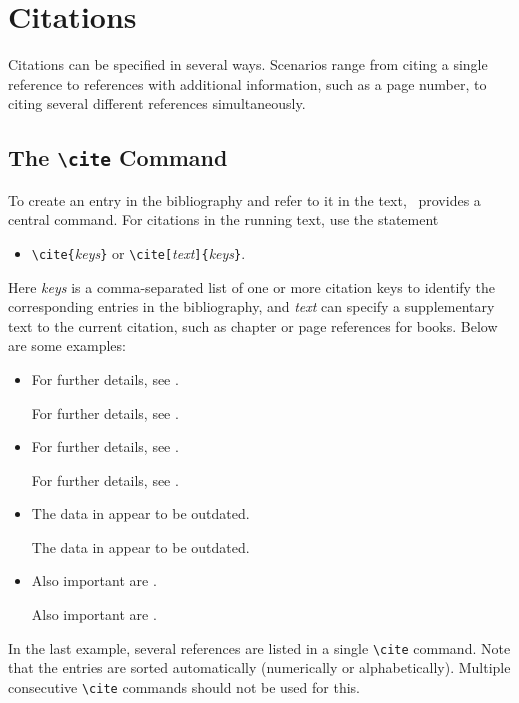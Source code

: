 \section{Citations}

Citations can be specified in several ways. Scenarios range from citing a single
reference to references with additional information, such as a page number, to
citing several different references simultaneously.

\subsection{The \texttt{\textbackslash cite} Command}

To create an entry in the bibliography and refer to it in the text, \latex\
provides a central command. For citations in the running text, use the
statement
%
\begin{itemize}
\item[] \verb!\cite{!\textit{keys}\verb!}! \quad or \quad
				\verb!\cite[!\textit{text}\verb!]{!\textit{keys}\verb!}!.
\end{itemize}
%
Here \textit{keys} is a comma-separated list of one or more citation keys to
identify the corresponding entries in the bibliography, and \textit{text} can
specify a supplementary text to the current citation, such as chapter or page
references for books. Below are some examples:
%
\begin{itemize}
    \item For further details, see \cite{Kopka2003}.
\begin{LaTeXCode}[numbers=none]
For further details, see \cite{Kopka2003}.
\end{LaTeXCode}
%
    \item For further details, see \cite[Ch.~3]{Kopka2003}.
\begin{LaTeXCode}[numbers=none]
For further details, see \cite[Ch.~3]{Kopka2003}.
\end{LaTeXCode}
%
    \item The data in \cite[pp.~274--277]{BurgeBurger1999} appear to be outdated.
\begin{LaTeXCode}[numbers=none]
The data in \cite[pp.~274--277]{BurgeBurger1999} appear to be  outdated.
\end{LaTeXCode}
%
    \item Also important are \cite{Patashnik1988,Feder2006,Duden1997}.
\begin{LaTeXCode}[numbers=none]
Also important are \cite{Patashnik1988,Feder2006,Duden1997}.
\end{LaTeXCode}
\end{itemize}
%
In the last example, several references are listed in a single
\texttt{\textbackslash cite} command. Note that the entries are sorted
automatically (numerically or alphabetically). Multiple consecutive
\texttt{\textbackslash cite} commands should not be used for this.

